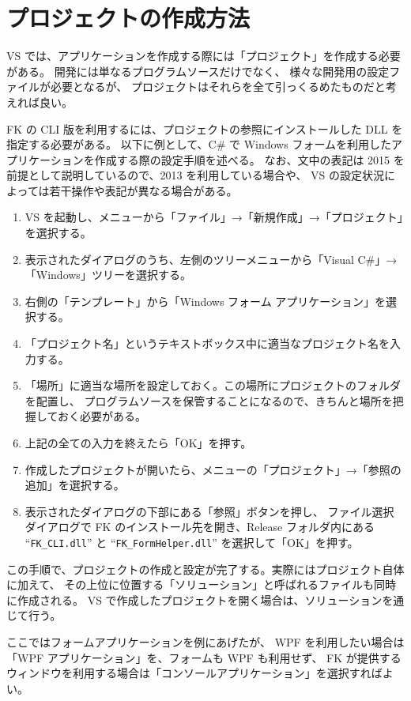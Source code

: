\documentclass[a4j]{jarticle}
\begin{document}
\section{プロジェクトの作成方法}
VS では、アプリケーションを作成する際には「プロジェクト」を作成する必要がある。
開発には単なるプログラムソースだけでなく、
様々な開発用の設定ファイルが必要となるが、
プロジェクトはそれらを全て引っくるめたものだと考えれば良い。

FK の CLI 版を利用するには、プロジェクトの参照にインストールした DLL を指定する必要がある。
以下に例として、C# で Windows フォームを利用したアプリケーションを作成する際の設定手順を述べる。
なお、文中の表記は 2015 を前提として説明しているので、2013 を利用している場合や、
VS の設定状況によっては若干操作や表記が異なる場合がある。

\begin{enumerate}
 \item VS を起動し、メニューから「ファイル」→「新規作成」→「プロジェクト」を選択する。
 \item 表示されたダイアログのうち、左側のツリーメニューから「Visual C#」→「Windows」ツリーを選択する。
 \item 右側の「テンプレート」から「Windows フォーム アプリケーション」を選択する。
 \item 「プロジェクト名」というテキストボックス中に適当なプロジェクト名を入力する。
 \item 「場所」に適当な場所を設定しておく。この場所にプロジェクトのフォルダを配置し、
	プログラムソースを保管することになるので、きちんと場所を把握しておく必要がある。
 \item 上記の全ての入力を終えたら「OK」を押す。
 \item 作成したプロジェクトが開いたら、メニューの「プロジェクト」→「参照の追加」を選択する。
 \item 表示されたダイアログの下部にある「参照」ボタンを押し、
 	ファイル選択ダイアログで FK のインストール先を開き、Release フォルダ内にある
 	``\verb+FK_CLI.dll+'' と ``\verb+FK_FormHelper.dll+'' を選択して「OK」を押す。
\end{enumerate}

この手順で、プロジェクトの作成と設定が完了する。実際にはプロジェクト自体に加えて、
その上位に位置する「ソリューション」と呼ばれるファイルも同時に作成される。
VS で作成したプロジェクトを開く場合は、ソリューションを通じて行う。

ここではフォームアプリケーションを例にあげたが、
WPF を利用したい場合は「WPF アプリケーション」を、フォームも WPF も利用せず、
FK が提供するウィンドウを利用する場合は「コンソールアプリケーション」を選択すればよい。
\end{document}

